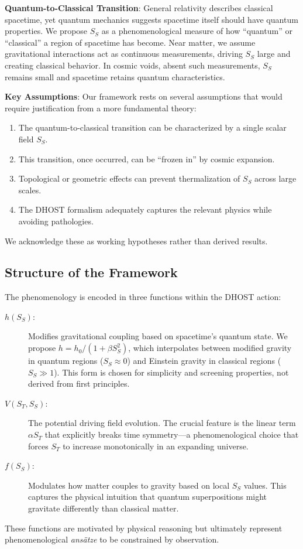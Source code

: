\documentclass[12pt]{article}
\begin{document}
\textbf{Quantum-to-Classical Transition}: General relativity describes classical spacetime, yet quantum mechanics suggests spacetime itself should have quantum properties. We propose $S_S$ as a phenomenological measure of how ``quantum'' or ``classical'' a region of spacetime has become. Near matter, we assume gravitational interactions act as continuous measurements, driving $S_S$ large and creating classical behavior. In cosmic voids, absent such measurements, $S_S$ remains small and spacetime retains quantum characteristics.

\textbf{Key Assumptions}: Our framework rests on several assumptions that would require justification from a more fundamental theory:
\begin{enumerate}
    \item The quantum-to-classical transition can be characterized by a single scalar field $S_S$.
    \item This transition, once occurred, can be ``frozen in'' by cosmic expansion.
    \item Topological or geometric effects can prevent thermalization of $S_S$ across large scales.
    \item The DHOST formalism adequately captures the relevant physics while avoiding pathologies.
\end{enumerate}
We acknowledge these as working hypotheses rather than derived results.

\subsection{Structure of the Framework}

The phenomenology is encoded in three functions within the DHOST action:
\begin{description}
    \item[$h(S_S)$:] Modifies gravitational coupling based on spacetime's quantum state. We propose $h = h_0/(1 + \beta S_S^2)$, which interpolates between modified gravity in quantum regions ($S_S \approx 0$) and Einstein gravity in classical regions ($S_S \gg 1$). This form is chosen for simplicity and screening properties, not derived from first principles.
    \item[$V(S_T, S_S)$:] The potential driving field evolution. The crucial feature is the linear term $\alpha S_T$ that explicitly breaks time symmetry---a phenomenological choice that forces $S_T$ to increase monotonically in an expanding universe.
    \item[$f(S_S)$:] Modulates how matter couples to gravity based on local $S_S$ values. This captures the physical intuition that quantum superpositions might gravitate differently than classical matter.
\end{description}
These functions are motivated by physical reasoning but ultimately represent phenomenological \textit{ans\"atze} to be constrained by observation.
\end{document}
